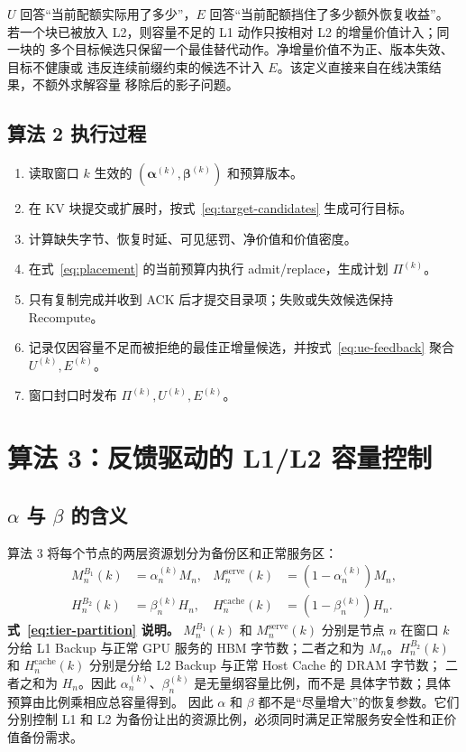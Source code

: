\documentclass[UTF8,11pt,a4paper,fontset=fandol]{ctexart}
\newcommand{\BOne}{B_1}
\newcommand{\BTwo}{B_2}
\begin{document}
$U$ 回答“当前配额实际用了多少”，$E$ 回答“当前配额挡住了多少额外恢复收益”。
若一个块已被放入 L2，则容量不足的 L1 动作只按相对 L2 的增量价值计入；同一块的
多个目标候选只保留一个最佳替代动作。净增量价值不为正、版本失效、目标不健康或
违反连续前缀约束的候选不计入 $E$。该定义直接来自在线决策结果，不额外求解容量
移除后的影子问题。

\subsection{算法 2 执行过程}

\begin{enumerate}
  \item 读取窗口 $k$ 生效的
    $(\boldsymbol\alpha^{(k)},\boldsymbol\beta^{(k)})$ 和预算版本。
  \item 在 KV 块提交或扩展时，按式~\eqref{eq:target-candidates} 生成可行目标。
  \item 计算缺失字节、恢复时延、可见惩罚、净价值和价值密度。
  \item 在式~\eqref{eq:placement} 的当前预算内执行 admit/replace，生成计划
    $\Pi^{(k)}$。
  \item 只有复制完成并收到 ACK 后才提交目录项；失败或失效候选保持 Recompute。
  \item 记录仅因容量不足而被拒绝的最佳正增量候选，并按式~\eqref{eq:ue-feedback}
    聚合 $U^{(k)},E^{(k)}$。
  \item 窗口封口时发布 $\Pi^{(k)},U^{(k)},E^{(k)}$。
\end{enumerate}

\section{算法 3：反馈驱动的 L1/L2 容量控制}

\subsection{\texorpdfstring{$\alpha$ 与 $\beta$}{alpha 与 beta} 的含义}

算法 3 将每个节点的两层资源划分为备份区和正常服务区：
\begin{equation}
  \begin{aligned}
    M_n^{\BOne}(k)&=\alpha_n^{(k)}M_n,
    &M_n^{\mathrm{serve}}(k)&=(1-\alpha_n^{(k)})M_n,\\
    H_n^{\BTwo}(k)&=\beta_n^{(k)}H_n,
    &H_n^{\mathrm{cache}}(k)&=(1-\beta_n^{(k)})H_n.
  \end{aligned}
  \label{eq:tier-partition}
\end{equation}
\noindent\textbf{式~\eqref{eq:tier-partition} 说明。}
$M_n^{\BOne}(k)$ 和 $M_n^{\mathrm{serve}}(k)$ 分别是节点 $n$ 在窗口 $k$ 分给 L1
Backup 与正常 GPU 服务的 HBM 字节数；二者之和为 $M_n$。$H_n^{\BTwo}(k)$ 和
$H_n^{\mathrm{cache}}(k)$ 分别是分给 L2 Backup 与正常 Host Cache 的 DRAM 字节数；
二者之和为 $H_n$。因此 $\alpha_n^{(k)}$、$\beta_n^{(k)}$ 是无量纲容量比例，而不是
具体字节数；具体预算由比例乘相应总容量得到。
因此 $\alpha$ 和 $\beta$ 都不是“尽量增大”的恢复参数。它们分别控制 L1 和 L2
为备份让出的资源比例，必须同时满足正常服务安全性和正价值备份需求。
\end{document}
